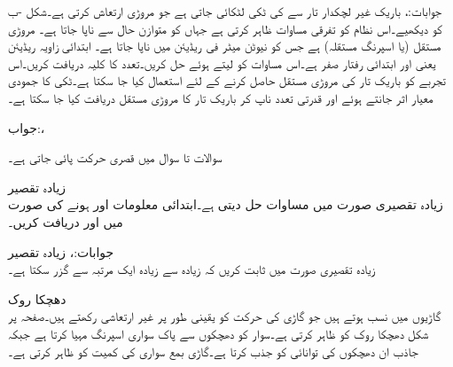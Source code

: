 جوابات:، 
باریک غیر لچکدار تار سے    کی ٹکی لٹکائی جاتی ہے جو مروڑی ارتعاش کرتی ہے۔شکل -ب کو دیکھیے۔اس نظام کو  تفرقی مساوات ظاہر کرتی ہے جہاں  کو  متوازن حال سے ناپا جاتا ہے۔  مروڑی مستقل (یا اسپرنگ مستقلہ) ہے جس کو  نیوٹن میٹر فی ریڈیئن میں ناپا جاتا ہے۔ ابتدائی زاویہ  ریڈیئن یعنی  اور ابتدائی رفتار صفر ہے۔اس مساوات کو  لیتے ہوئے  حل کریں۔تعدد کا کلیہ دریافت کریں۔اس تجربے کو باریک تار کی مروڑی مستقل  حاصل کرنے کے لئے استعمال کیا جا سکتا  ہے۔ٹکی کا جمودی معیار اثر جانتے ہوئے اور قدرتی تعدد ناپ کر باریک تار کا مروڑی مستقل  دریافت کیا جا سکتا ہے۔ 

جواب:، 

سوالات  تا سوال  میں قصری حرکت پائی جاتی ہے۔

\quad زیادہ تقصیر\\
زیادہ تقصیری صورت میں مساوات  حل دیتی ہے۔ابتدائی معلومات  اور  ہونے کی صورت میں  اور  دریافت کریں۔

جوابات:،
\quad زیادہ تقصیر\\
زیادہ تقصیری صورت میں ثابت کریں کہ  زیادہ سے زیادہ ایک مرتبہ  سے گزر سکتا ہے۔

\quad دھچکا روک\\
گاڑیوں میں  نسب ہوتے ہیں جو گاڑی کی حرکت کو یقینی طور پر غیر ارتعاشی رکھتے ہیں۔صفحہ  پر شکل  دھچکا روک کو ظاہر کرتی ہے۔سوار کو دھچکوں سے پاک سواری اسپرنگ مہیا کرتا ہے جبکہ جاذب ان دھچکوں کی توانائی کو جذب کرتا ہے۔گاڑی بمع سواری کی کمیت کو  ظاہر کرتی ہے۔

